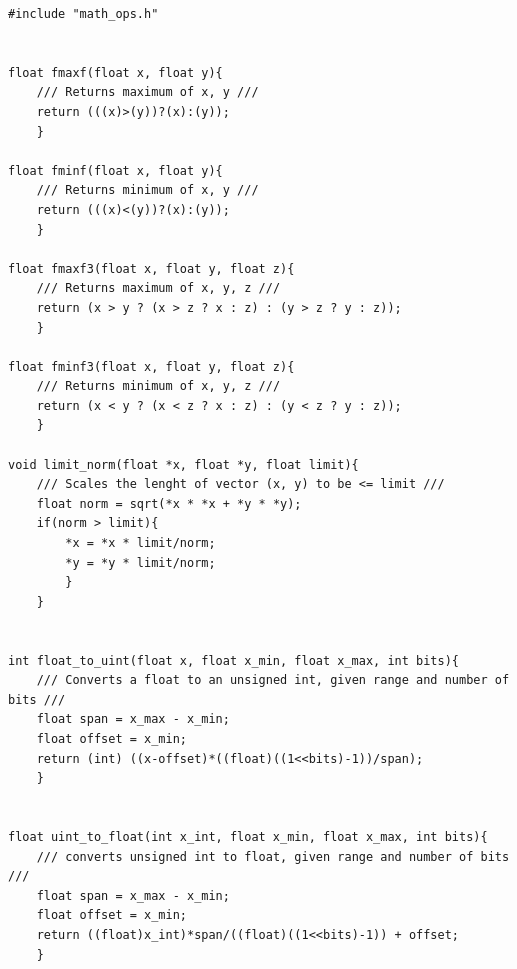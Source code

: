 \begin{lstlisting}[language=Arduino, caption= math\_ops.cpp, basicstyle=\scriptsize]
#include "math_ops.h"


float fmaxf(float x, float y){
    /// Returns maximum of x, y ///
    return (((x)>(y))?(x):(y));
    }

float fminf(float x, float y){
    /// Returns minimum of x, y ///
    return (((x)<(y))?(x):(y));
    }

float fmaxf3(float x, float y, float z){
    /// Returns maximum of x, y, z ///
    return (x > y ? (x > z ? x : z) : (y > z ? y : z));
    }

float fminf3(float x, float y, float z){
    /// Returns minimum of x, y, z ///
    return (x < y ? (x < z ? x : z) : (y < z ? y : z));
    }
    
void limit_norm(float *x, float *y, float limit){
    /// Scales the lenght of vector (x, y) to be <= limit ///
    float norm = sqrt(*x * *x + *y * *y);
    if(norm > limit){
        *x = *x * limit/norm;
        *y = *y * limit/norm;
        }
    }


int float_to_uint(float x, float x_min, float x_max, int bits){
    /// Converts a float to an unsigned int, given range and number of bits ///
    float span = x_max - x_min;
    float offset = x_min;
    return (int) ((x-offset)*((float)((1<<bits)-1))/span);
    }
    
    
float uint_to_float(int x_int, float x_min, float x_max, int bits){
    /// converts unsigned int to float, given range and number of bits ///
    float span = x_max - x_min;
    float offset = x_min;
    return ((float)x_int)*span/((float)((1<<bits)-1)) + offset;
    }

\end{lstlisting}

\blankpage